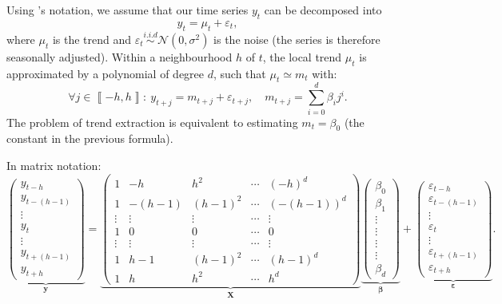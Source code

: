 \documentclass[
]{article}
\newcommand\1{\mathds{1}}
\begin{document}
Using \textcite{proietti2008}'s notation, we assume that our time series
\(y_t\) can be decomposed into \[
y_t=\mu_t+\varepsilon_t,
\] where \(\mu_t\) is the trend and
\(\varepsilon_{t}\overset{i.i.d}{\sim}\mathcal{N}(0,\sigma^{2})\) is the
noise (the series is therefore seasonally adjusted). Within a
neighbourhood \(h\) of \(t\), the local trend \(\mu_t\) is approximated
by a polynomial of degree \(d\), such that \(\mu_t\simeq m_{t}\) with:
\[
\forall j\in\left\llbracket -h,h\right\rrbracket:\:
y_{t+j}=m_{t+j}+\varepsilon_{t+j},\quad m_{t+j}=\sum_{i=0}^{d}\beta_{i}j^{i}.
\] The problem of trend extraction is equivalent to estimating
\(m_t=\beta_0\) (the constant in the previous formula).

In matrix notation: \[
\underbrace{\begin{pmatrix}y_{t-h}\\
y_{t-(h-1)}\\
\vdots\\
y_{t}\\
\vdots\\
y_{t+(h-1)}\\
y_{t+h}
\end{pmatrix}}_{\boldsymbol y}=\underbrace{\begin{pmatrix}1 & -h & h^{2} & \cdots & (-h)^{d}\\
1 & -(h-1) & (h-1)^{2} & \cdots & (-(h-1))^{d}\\
\vdots & \vdots & \vdots & \cdots & \vdots\\
1 & 0 & 0 & \cdots & 0\\
\vdots & \vdots & \vdots & \cdots & \vdots\\
1 & h-1 & (h-1)^{2} & \cdots & (h-1)^{d}\\
1 & h & h^{2} & \cdots & h^{d}
\end{pmatrix}}_{\boldsymbol X}\underbrace{\begin{pmatrix}\beta_{0}\\
\beta_{1}\\
\vdots\\
\vdots\\
\vdots\\
\vdots\\
\beta_{d}
\end{pmatrix}}_{\boldsymbol \beta}+\underbrace{\begin{pmatrix}\varepsilon_{t-h}\\
\varepsilon_{t-(h-1)}\\
\vdots\\
\varepsilon_{t}\\
\vdots\\
\varepsilon_{t+(h-1)}\\
\varepsilon_{t+h}
\end{pmatrix}}_{\boldsymbol \varepsilon}.
\]
\end{document}
